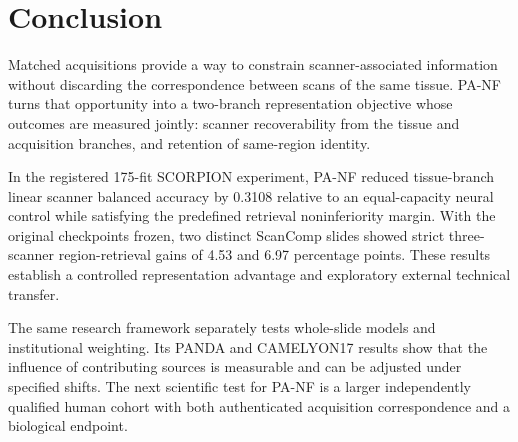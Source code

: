 \section{Conclusion}

Matched acquisitions provide a way to constrain scanner-associated information without discarding the correspondence between scans of the same tissue. PA-NF turns that opportunity into a two-branch representation objective whose outcomes are measured jointly: scanner recoverability from the tissue and acquisition branches, and retention of same-region identity.

In the registered 175-fit SCORPION experiment, PA-NF reduced tissue-branch linear scanner balanced accuracy by 0.3108 relative to an equal-capacity neural control while satisfying the predefined retrieval noninferiority margin. With the original checkpoints frozen, two distinct ScanComp slides showed strict three-scanner region-retrieval gains of 4.53 and 6.97 percentage points. These results establish a controlled representation advantage and exploratory external technical transfer.

The same research framework separately tests whole-slide models and institutional weighting. Its PANDA and CAMELYON17 results show that the influence of contributing sources is measurable and can be adjusted under specified shifts. The next scientific test for PA-NF is a larger independently qualified human cohort with both authenticated acquisition correspondence and a biological endpoint.
